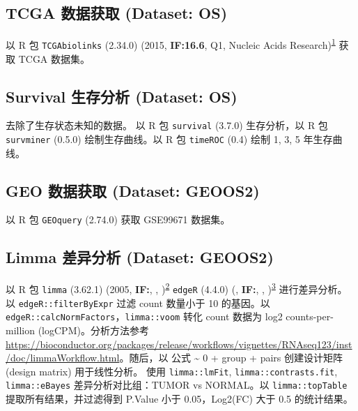 \documentclass[
]{article}
\begin{document}
\hypertarget{tcga-ux6570ux636eux83b7ux53d6-dataset-os}{%
\subsection{TCGA 数据获取 (Dataset: OS)}\label{tcga-ux6570ux636eux83b7ux53d6-dataset-os}}

以 R 包 \texttt{TCGAbiolinks} (2.34.0) (2015, \textbf{IF:16.6}, Q1, Nucleic Acids Research)\textsuperscript{\protect\hyperlink{ref-TcgabiolinksAColapr2015}{1}} 获取 TCGA 数据集。

\hypertarget{survival-ux751fux5b58ux5206ux6790-dataset-os}{%
\subsection{Survival 生存分析 (Dataset: OS)}\label{survival-ux751fux5b58ux5206ux6790-dataset-os}}

去除了生存状态未知的数据。
以 R 包 \texttt{survival} (3.7.0) 生存分析，以 R 包 \texttt{survminer} (0.5.0) 绘制生存曲线。以 R 包 \texttt{timeROC} (0.4) 绘制 1, 3, 5 年生存曲线。

\hypertarget{geo-ux6570ux636eux83b7ux53d6-dataset-geoos2}{%
\subsection{GEO 数据获取 (Dataset: GEOOS2)}\label{geo-ux6570ux636eux83b7ux53d6-dataset-geoos2}}

以 R 包 \texttt{GEOquery} (2.74.0) 获取 GSE99671 数据集。

\hypertarget{limma-ux5deeux5f02ux5206ux6790-dataset-geoos2}{%
\subsection{Limma 差异分析 (Dataset: GEOOS2)}\label{limma-ux5deeux5f02ux5206ux6790-dataset-geoos2}}

以 R 包 \texttt{limma} (3.62.1) (2005, \textbf{IF:}, , )\textsuperscript{\protect\hyperlink{ref-LimmaLinearMSmyth2005}{2}} \texttt{edgeR} (4.4.0) (, \textbf{IF:}, , )\textsuperscript{\protect\hyperlink{ref-EdgerDifferenChen}{3}} 进行差异分析。以 \texttt{edgeR::filterByExpr} 过滤 count 数量小于 10 的基因。以 \texttt{edgeR::calcNormFactors}，\texttt{limma::voom} 转化 count 数据为 log2 counts-per-million (logCPM)。分析方法参考 \url{https://bioconductor.org/packages/release/workflows/vignettes/RNAseq123/inst/doc/limmaWorkflow.html}。随后，以 公式 \textasciitilde{} 0 + group + pairs 创建设计矩阵 (design matrix) 用于线性分析。
使用 \texttt{limma::lmFit}, \texttt{limma::contrasts.fit}, \texttt{limma::eBayes} 差异分析对比组：TUMOR vs NORMAL。以 \texttt{limma::topTable} 提取所有结果，并过滤得到 P.Value 小于 0.05，\textbar Log2(FC)\textbar{} 大于 0.5 的统计结果。
\end{document}
